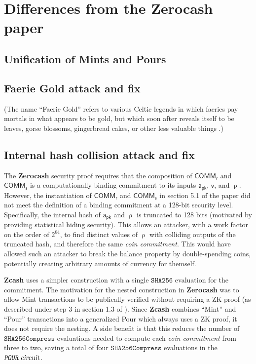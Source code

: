 \documentclass{article}
\newcommand{\todo}[1]{{\color{Sepia}\sf{TODO: #1}}}
\newcommand{\term}[1]{\textsl{#1}\xspace}
\newcommand{\termbf}[1]{\textbf{#1}\xspace}
\newcommand{\Zcash}{\termbf{Zcash}}
\newcommand{\Zerocash}{\termbf{Zerocash}}
\newcommand{\coinCommitment}{\term{coin commitment}}
\newcommand{\AuthPublic}{\mathsf{a_{pk}}}
\newcommand{\Value}{\mathsf{v}}
\newcommand{\CoinCommitRand}{\mathsf{r}}
\newcommand{\CoinAddressRand}{\mathsf{\uprho}}
\newcommand{\CoinCommitS}{\mathsf{s}}
\newcommand{\FullHash}{\mathtt{SHA256}}
\newcommand{\SHA}{\mathtt{SHA256Compress}}
\newcommand{\PourCircuit}{\term{\texttt{POUR} circuit}}
\newcommand{\COMM}[1]{\mathsf{COMM}_{#1}}
\begin{document}
\section{Differences from the Zerocash paper}

\subsection{Unification of Mints and Pours}

\todo{}

\subsection{Faerie Gold attack and fix}

\todo{}

(The name ``Faerie Gold'' refers to various Celtic legends in which
faeries pay mortals in what appears to be gold, but which soon after
reveals itself to be leaves, gorse blossoms, gingerbread cakes, or
other less valuable things \cite{LG2004}.)

\subsection{Internal hash collision attack and fix}

The \Zerocash security proof requires that the composition of
$\COMM{\CoinCommitRand}$ and $\COMM{\CoinCommitS}$ is a computationally
binding commitment to its inputs $\AuthPublic$, $\Value$, and
$\CoinAddressRand$. However, the instantiation of $\COMM{\CoinCommitRand}$
and $\COMM{\CoinCommitS}$ in section 5.1 of the paper did not meet
the definition of a binding commitment at a 128-bit security level.
Specifically, the internal hash of $\AuthPublic$ and $\CoinAddressRand$
is truncated to 128 bits (motivated by providing statistical hiding
security). This allows an attacker, with a work factor on the order of
$2^{64}$, to find distinct values of $\CoinAddressRand$ with colliding
outputs of the truncated hash, and therefore the same \coinCommitment.
This would have allowed such an attacker to break the balance property
by double-spending coins, potentially creating arbitrary amounts of
currency for themself.

\Zcash uses a simpler construction with a single $\FullHash$ evaluation
for the commitment. The motivation for the nested construction in \Zerocash
was to allow Mint transactions to be publically verified without requiring
a ZK proof (as described under step 3 in section 1.3 of
\cite{ZerocashOakland}). Since \Zcash combines ``Mint'' and ``Pour''
transactions into a generalized Pour which always uses a ZK proof, it
does not require the nesting. A side benefit is that this reduces the
number of $\SHA$ evaluations needed to compute each \coinCommitment from
three to two, saving a total of four $\SHA$ evaluations in the
$\PourCircuit$.
\end{document}
